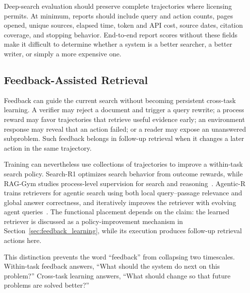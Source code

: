 Deep-search evaluation should preserve complete trajectories where licensing permits. At minimum, reports should include query and action counts, pages opened, unique sources, elapsed time, token and API cost, source dates, citation coverage, and stopping behavior. End-to-end report scores without these fields make it difficult to determine whether a system is a better searcher, a better writer, or simply a more expensive one.

\subsection{Feedback-Assisted Retrieval}
\label{subsec:feedback_assisted_retrieval}

Feedback can guide the current search without becoming persistent cross-task learning. A verifier may reject a document and trigger a query rewrite; a process reward may favor trajectories that retrieve useful evidence early; an environment response may reveal that an action failed; or a reader may expose an unanswered subproblem. Such feedback belongs in follow-up retrieval when it changes a later action in the same trajectory.

Training can nevertheless use collections of trajectories to improve a within-task search policy. Search-R1 optimizes search behavior from outcome rewards, while RAG-Gym studies process-level supervision for search and reasoning~\cite{jin2025searchr1,xiong2025raggym}. Agentic-R trains retrievers for agentic search using both local query--passage relevance and global answer correctness, and iteratively improves the retriever with evolving agent queries~\cite{liu2026agenticr}. The functional placement depends on the claim: the learned retriever is discussed as a policy-improvement mechanism in Section~\ref{sec:feedback_learning}, while its execution produces follow-up retrieval actions here.

This distinction prevents the word ``feedback'' from collapsing two timescales. Within-task feedback answers, ``What should the system do next on this problem?'' Cross-task learning answers, ``What should change so that future problems are solved better?''

